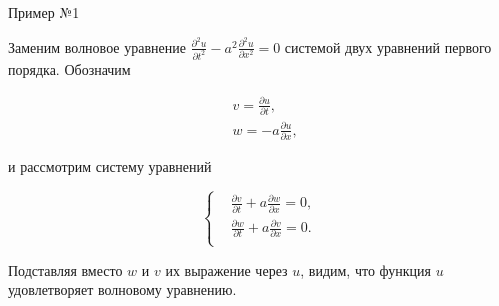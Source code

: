 \documentclass[10pt,xcolor=pst,aspectratio=169]{beamer}
\begin{document}
\begin{frame}{Пример №1}

    \transdissolve[duration=0.1]
    \justifying
    \large

%
%
%

    Заменим волновое уравнение $\frac{\partial^{2} u}{\partial t^{2}} - a^{2} \frac{\partial^{2} u}{\partial x^{2}} = 0$ системой двух уравнений первого порядка. Обозначим


    \[
        \begin{split}
            &v = \frac{\partial u}{\partial t},\\
            &w = - a \frac{\partial u}{\partial x},
        \end{split}
    \]

    и рассмотрим систему уравнений

    \[
        \begin{cases}
            &\frac{\partial v}{\partial t} + a \frac{\partial w}{\partial x} = 0, \\
            &\frac{\partial w}{\partial t} + a \frac{\partial v}{\partial x} = 0. \\
        \end{cases}
    \]

    Подставляя вместо $w$ и $v$ их выражение через $u$, видим, что функция $u$ удовлетворяет волновому уравнению.

\end{frame}
\end{document}

